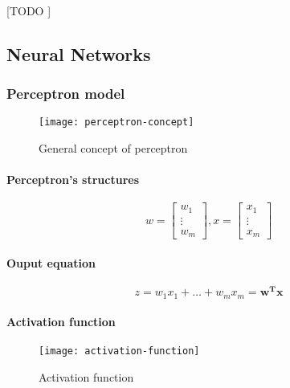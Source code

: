 \documentclass{article}
\begin{document}
				\paragraph{}
				[TODO ]


		\subsection{Neural Networks}
		\label{sec:neural-networks}

			\subsubsection{Perceptron model}

			\begin{figure}
				\centering
				\texttt{[image: perceptron-concept]}
				\caption{General concept of perceptron}
				\label{fig:perceptron-concept}
			\end{figure}

			\paragraph{Perceptron's structures}
			\begin{equation}
				w = \begin{bmatrix}
						w_1 \\
						\vdots \\
						w_m
					\end{bmatrix}, x =
					\begin{bmatrix}
						x_1 \\
						\vdots \\
						x_m
					\end{bmatrix}
			\end{equation}

			\paragraph{Ouput equation}
			\begin{equation}
				z = w_1 x_1 + \dots + w_m x_m = \boldsymbol{w^T x}
			\end{equation}


			\paragraph{Activation function}

			\begin{figure}
				\centering
				\texttt{[image: activation-function]}
				\caption{Activation function}
				\label{fig:activation-function}
			\end{figure}
\end{document}
